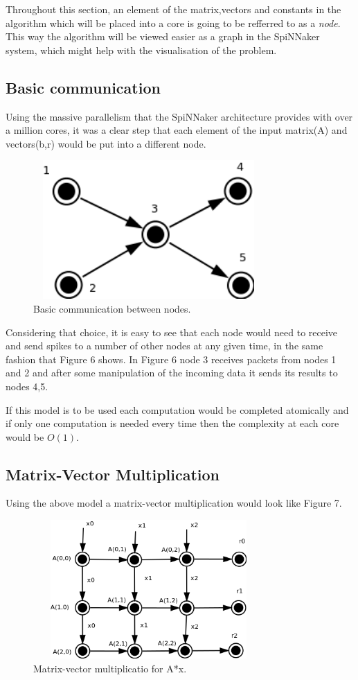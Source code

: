 \documentclass[12pt,a4paper]{article}
\begin{document}
Throughout this section, an element of the matrix,vectors and constants in the algorithm which will be placed into a core is going to be refferred to as a \emph{node}. This way the algorithm will be viewed easier as a graph in the SpiNNaker system, which might help with the visualisation of the problem.

\subsection{Basic communication}
Using the massive parallelism that the SpiNNaker architecture provides with over a million cores, it was a clear step that each element of the input matrix(A) and vectors(b,r) would be put into a different node. 
\begin{figure}[h!]
\includegraphics[width=250pt,height=150pt,scale=2]{Pics/basic.png}
\centering
\caption{Basic communication between nodes.}
\end{figure}
Considering that choice, it is easy to see that each node would need to receive and send spikes to a number of other nodes at any given time, in the same fashion that Figure 6 shows. In Figure 6 node 3 receives packets from nodes 1 and 2 and after some manipulation of the incoming data it sends its results to nodes 4,5. 

If this model is to be used each computation would be completed atomically and if only one computation is needed every time then the complexity at each core would be $O(1)$.
\subsection{Matrix-Vector Multiplication}
Using the above model a matrix-vector multiplication would look like Figure 7. 
\begin{figure}[h!]
\includegraphics[width=250pt,height=150pt,scale=2]{Pics/mat0mult.png}
\centering
\caption{Matrix-vector multiplicatio for A*x.\cite{basicinterim}}
\end{figure}
\end{document}
